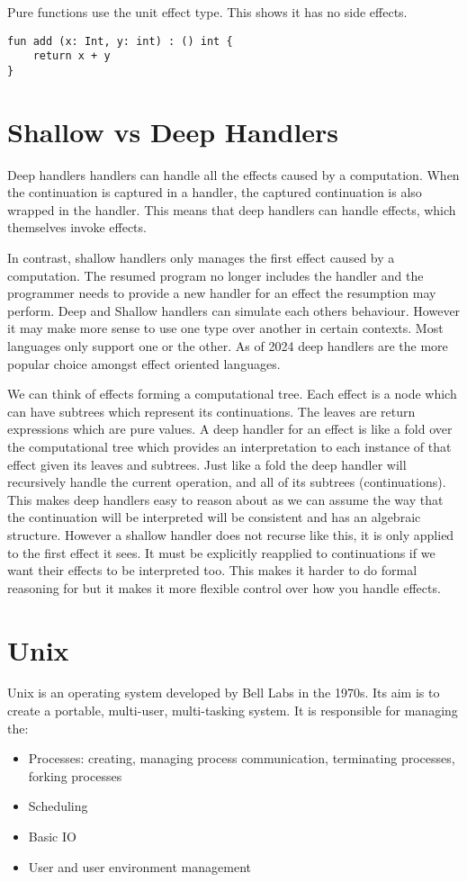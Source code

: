 \documentclass[logo,bsc,singlespacing,parskip]{infthesis}
\begin{document}
Pure functions use the unit effect type. This shows it has no side effects. 

\begin{lstlisting}
fun add (x: Int, y: int) : () int {
	return x + y
}
\end{lstlisting}

\section{Shallow vs Deep Handlers}

Deep handlers \cite{hillerstrom_foundations_nodate} handlers can handle all the effects caused by a computation. When the continuation is captured in a handler, the captured continuation is also wrapped in the handler. This means that deep handlers can handle effects, which themselves invoke effects. 

In contrast, shallow handlers \cite{ryu_shallow_2018} only manages the first effect caused by a computation. The resumed program no longer includes the handler and the programmer needs to provide a new handler for an effect the resumption may perform.
Deep and Shallow handlers can simulate each others behaviour. However it may make more sense to use one type over another in certain contexts. Most languages only support one or the other. As of 2024 deep handlers are the more popular choice amongst effect oriented languages.

We can think of effects forming a computational tree. Each effect is a node which can have subtrees which represent its continuations. The leaves are return expressions which are pure values. A deep handler for an effect is like a fold over the computational tree which provides an interpretation to each instance of that effect given its leaves and subtrees. Just like a fold the deep handler will recursively handle the current operation, and all of its subtrees (continuations). This makes deep handlers easy to reason about as we can assume the way that the continuation will be interpreted will be consistent and has an algebraic structure.
However a shallow handler does not recurse like this, it is only applied to the first effect it sees. It must be explicitly reapplied to continuations if we want their effects to be interpreted too. This makes it harder to do formal reasoning for but it makes it more flexible control over how you handle effects.


\section{Unix}
Unix is an operating system developed by Bell Labs in the 1970s. Its aim is to create a portable, multi-user, multi-tasking system. It is responsible for managing the:
\begin{itemize}
    \item Processes: creating, managing process communication, terminating processes, forking processes
    \item Scheduling
    \item Basic IO
    \item User and user environment management
\end{itemize}
\end{document}
